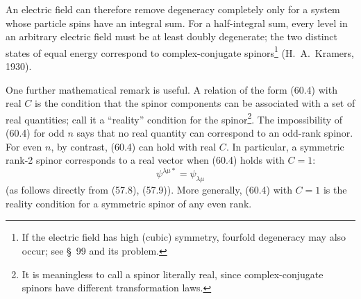 An electric field can therefore remove degeneracy completely only for a
system whose particle spins have an integral sum. For a half-integral sum,
every level in an arbitrary electric field must be at least doubly degenerate;
the two distinct states of equal energy correspond to complex-conjugate
spinors\footnote{If the electric field has high (cubic) symmetry, fourfold
degeneracy may also occur; see \S~99 and its problem.} (H.~A.~Kramers, 1930).

One further mathematical remark is useful. A relation of the form (60.4) with
real $C$ is the condition that the spinor components can be associated with a
set of real quantities; call it a ``reality'' condition for the
spinor\footnote{It is meaningless to call a spinor literally real, since
complex-conjugate spinors have different transformation laws.}. The
impossibility of (60.4) for odd $n$ says that no real quantity can correspond
to an odd-rank spinor. For even $n$, by contrast, (60.4) can hold with real
$C$. In particular, a symmetric rank-2 spinor corresponds to a real vector
when (60.4) holds with $C=1$:
\[
 \psi^{\lambda\mu*}=\psi_{\lambda\mu}
\]
(as follows directly from (57.8), (57.9)). More generally, (60.4) with $C=1$
is the reality condition for a symmetric spinor of any even rank.
